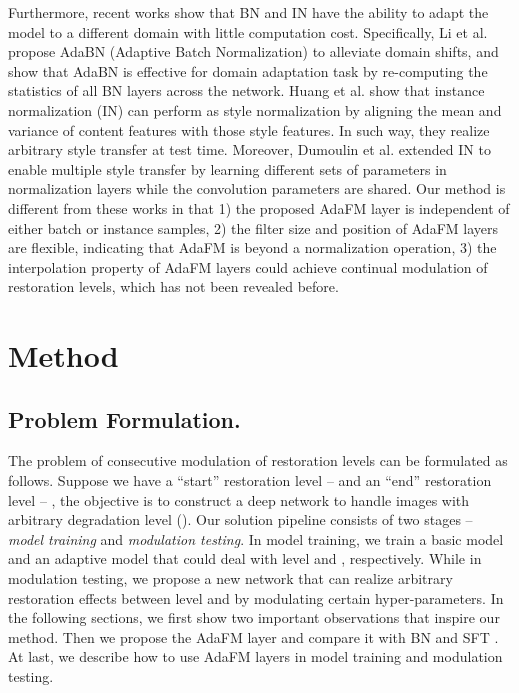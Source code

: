 \documentclass[10pt,twocolumn,letterpaper]{article}
\begin{document}
Furthermore, recent works show that BN and IN have the ability to adapt the model to a different domain with little computation cost.
Specifically, Li et al. \cite{Li2017RevisitingBN} propose AdaBN (Adaptive Batch Normalization) to alleviate domain shifts, and show that AdaBN is effective for domain adaptation task by re-computing the statistics of all BN layers across the network. Huang et al. \cite{huang2017arbitrary} show that instance normalization (IN) can perform as style normalization by aligning the mean and variance of content features with those style features. In such way, they realize arbitrary style transfer at test time. Moreover, Dumoulin et al. \cite{dumoulin2017learned} extended IN to enable multiple style transfer by learning different sets of parameters in normalization layers while the convolution parameters are shared. Our method is different from these works in that 1) the proposed AdaFM layer is independent of either batch or instance samples, 2) the filter size and position of AdaFM layers are flexible, indicating that AdaFM is beyond a normalization operation, 3) the interpolation property of AdaFM layers could achieve continual modulation of restoration levels, which has not been revealed before.



\section{Method}

\subsection{Problem Formulation.}
The problem of consecutive modulation of restoration levels can be formulated as follows.
Suppose we have a ``start'' restoration level --  and an ``end'' restoration level -- , the objective is to construct a deep network to handle images with arbitrary degradation level  (). 
Our solution pipeline consists of two stages -- \textit{model training} and \textit{modulation testing}. In model training, we train a basic model and an adaptive model that could deal with level  and , respectively. While in modulation testing, we propose a new network that can realize arbitrary restoration effects between level  and  by modulating certain hyper-parameters. In the following sections, we first show two important observations that inspire our method. Then we propose the AdaFM layer and compare it with BN \cite{Ioffe2015BatchNA} and SFT \cite{wang2018recovering}. At last, we describe how to use AdaFM layers in model training and modulation testing.
\end{document}
